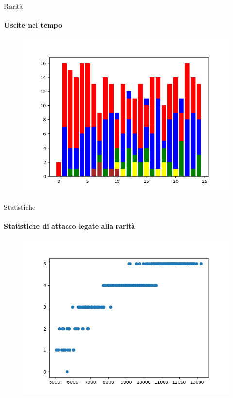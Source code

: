 \documentclass{beamer}
\begin{document}
\begin{darkframes}
  \begin{frame}{Rarità}
    \framesubtitle{Uscite nel tempo}
    \begin{figure}
      \centering
      \includegraphics[scale=0.55]{./images/rarity_per_year_bar.png}
    \end{figure}
  \end{frame}

  \begin{frame}{Statistiche}
    \framesubtitle{Statistiche di attacco legate alla rarità}
    \begin{figure}
      \centering
      \includegraphics[scale=0.55]{./images/class_and_stats_atk.png}
    \end{figure}
  \end{frame}


\end{darkframes}
\end{document}
